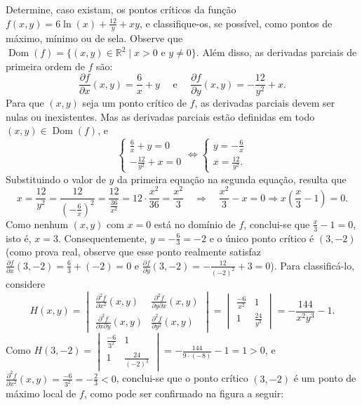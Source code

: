 \documentclass[12pt,a4paper]{article}
\newcommand*\dom[1]{\operatorname{Dom}\left(#1\right)}
\newcommand*\R{\mathbb{R}}
\begin{document}
\begin{ExerciseList}
\Exercise[title={2,0}] Determine, caso existam, os pontos críticos da função $f(x,y) = 6\ln(x)+\frac{12}{y} + xy$, e classifique-os, se possível, como pontos de máximo, mínimo ou de sela.
\Answer Observe que $\dom{f} = \{(x,y) \in \R^2 \mid x > 0 \text{ e } y \neq 0 \}$. Além disso, as derivadas parciais de primeira ordem de $f$ são:
\[
  \frac{\partial f}{\partial x}(x, y) = \frac{6}{x} + y
  \quad\text{ e }\quad
  \frac{\partial f}{\partial y}(x, y) = -\frac{12}{y^2} + x.
\]
Para que $(x, y)$ seja um ponto crítico de $f$, as derivadas parciais devem ser nulas ou inexistentes. Mas as derivadas parciais estão definidas em todo $(x, y) \in \dom{f}$, e
\[
  \begin{cases}
    \frac{6}{x} + y = 0 \\
    -\frac{12}{y^2} + x = 0
    \end{cases}
  \Leftrightarrow
  \begin{cases}
    y = -\frac{6}{x} \\
    x = \frac{12}{y^2}.
    \end{cases}
\]
Substituindo o valor de $y$ da primeira equação na segunda equação, resulta que
\[
  x
  = \frac{12}{y^2}
  = \frac{12}{\left(-\frac{6}{x}\right)^2}
  = \frac{12}{\frac{36}{x^2}}
  = 12 \cdot \frac{x^2}{36}
  = \frac{x^2}{3}
  \quad\Rightarrow\quad
  \frac{x^2}{3} - x = 0
  \Rightarrow
  x\left(\frac{x}{3} - 1\right) = 0.
\]
Como nenhum $(x, y)$ com $x=0$ está no domínio de $f$, conclui-se que $\frac{x}{3} - 1 = 0$, isto é, $x = 3$. Consequentemente, $y = -\frac{6}{3} = -2$ e o único ponto crítico é $(3, -2)$ (como prova real, observe que esse ponto realmente satisfaz $\frac{\partial f}{\partial x}(3, -2) = \frac{6}{3} + (-2) = 0$ e $\frac{\partial f}{\partial y}(3, -2) = -\frac{12}{(-2)^2} + 3 = 0$). Para classificá-lo, considere
\[
H(x, y) =
\begin{vmatrix}
  \frac{\partial^2 f}{\partial x^2}(x, y) & \frac{\partial^2 f}{\partial y \partial x}(x, y) \\
  \frac{\partial^2 f}{\partial x\partial y}(x, y) & \frac{\partial^2 f}{\partial y^2}(x, y)
\end{vmatrix}
=
\begin{vmatrix}
  \frac{-6}{x^2} & 1 \\
  1 & \frac{24}{y^3}
\end{vmatrix}
= -\frac{144}{x^2y^3} - 1.
\]
Como $H(3, -2) = \begin{vmatrix}
  \frac{-6}{3^2} & 1 \\
  1 & \frac{24}{(-2)^3}
\end{vmatrix} = -\frac{144}{9 \cdot (-8)} - 1 = 1 > 0$, e $\frac{\partial^2 f}{\partial x^2}(x, y) = \frac{-6}{3^2} = -\frac{2}{3} < 0$, conclui-se que o ponto crítico $(3, -2)$ é um ponto de máximo local de $f$, como pode ser confirmado na figura a seguir:



\end{ExerciseList}
\end{document}

